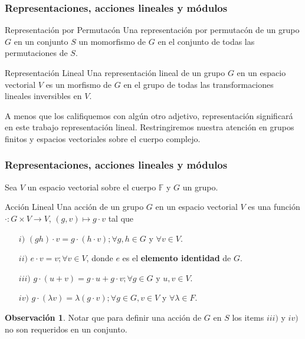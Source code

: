 \documentclass[11pt,spanish]{beamer}
\theoremstyle{mystyle}
\begin{document}
    \begin{frame}
	\frametitle{Representaciones, acciones lineales y m\'odulos}
	
	\begin{block}{Representaci\'on por Permutac\'on}
		Una representaci\'on por permutac\'on de un grupo $G$ en un conjunto $S$ un
		momorfismo de $G$ en el conjunto de todas las permutaciones de $S$.
	\end{block}
	
	\begin{block}{Representaci\'on Lineal }
		Una representaci\'on lineal de un grupo $G$ en un espacio vectorial $V$ es un
		morfismo de $G$ en el grupo de todas las transformaciones lineales inversibles en $V$.
	\end{block}
	
	A menos que los califiquemos con alg\'un otro adjetivo, representaci\'on significar\'a en este trabajo
	representaci\'on lineal. Restringiremos nuestra atenci\'on en grupos finitos y espacios vectoriales sobre
	el cuerpo complejo.
    \end{frame}



    \begin{frame}
	\frametitle{Representaciones, acciones lineales y m\'odulos}
	Sea $V$ un espacio vectorial sobre el cuerpo $\mathbb{F}$ y $G$ un grupo.
	\begin{block}{Acción Lineal}
		Una acción de un grupo $G$ en un espacio vectorial $V$ es una función 
		$\cdot : G \times V \to V$, $(g, v) \mapsto g \cdot v $  tal que
		\begin{itemize}
			\item[$i)$] $(gh)\cdot v = g \cdot (h \cdot v); \forall g, h \in G$ y $\forall v \in V$.
			\item[$ii)$] $e \cdot v = v; \forall v \in V$, donde $e$ es el \textbf{elemento identidad} de $G$.
			\item[$iii)$] $g \cdot (u+v) = g \cdot u + g \cdot v; \forall g \in G$ y $u,v \in V$.
			\item[$iv)$] $g \cdot (\lambda v) = \lambda(g \cdot v); \forall  g \in G, v \in V$ y $\forall \lambda \in F$.
		\end{itemize}
	\end{block}
	\textbf{Observación 1}. Notar que para definir una acción de $G$ en $S$ 
	los items $iii)$ y $iv)$ no son requeridos en un conjunto.
    \end{frame}
\end{document}
